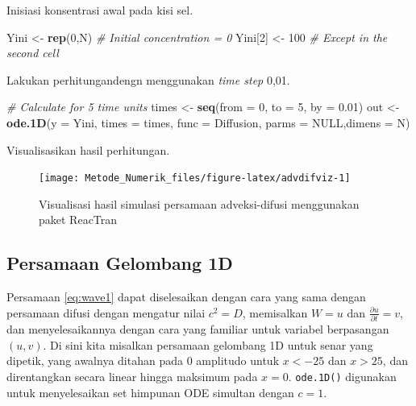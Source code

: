 \documentclass[
]{book}
\newenvironment{Shaded}{\begin{snugshade}}{\end{snugshade}}
\newcommand{\AttributeTok}[1]{\textcolor[rgb]{0.13,0.29,0.53}{#1}}
\newcommand{\CommentTok}[1]{\textcolor[rgb]{0.56,0.35,0.01}{\textit{#1}}}
\newcommand{\ConstantTok}[1]{\textcolor[rgb]{0.56,0.35,0.01}{#1}}
\newcommand{\DecValTok}[1]{\textcolor[rgb]{0.00,0.00,0.81}{#1}}
\newcommand{\FloatTok}[1]{\textcolor[rgb]{0.00,0.00,0.81}{#1}}
\newcommand{\FunctionTok}[1]{\textcolor[rgb]{0.13,0.29,0.53}{\textbf{#1}}}
\newcommand{\NormalTok}[1]{#1}
\newcommand{\OtherTok}[1]{\textcolor[rgb]{0.56,0.35,0.01}{#1}}
\theoremstyle{definition}
\theoremstyle{definition}
\theoremstyle{definition}
\theoremstyle{definition}
\theoremstyle{remark}
\begin{document}
Inisiasi konsentrasi awal pada kisi sel.

\begin{Shaded}
\begin{Highlighting}[]
\NormalTok{Yini }\OtherTok{\textless{}{-}} \FunctionTok{rep}\NormalTok{(}\DecValTok{0}\NormalTok{,N) }\CommentTok{\# Initial concentration = 0}
\NormalTok{Yini[}\DecValTok{2}\NormalTok{] }\OtherTok{\textless{}{-}} \DecValTok{100}   \CommentTok{\# Except in the second cell}
\end{Highlighting}
\end{Shaded}

Lakukan perhitungandengn menggunakan \emph{time step} 0,01.

\begin{Shaded}
\begin{Highlighting}[]
\CommentTok{\# Calculate for 5 time units}
\NormalTok{times }\OtherTok{\textless{}{-}} \FunctionTok{seq}\NormalTok{(}\AttributeTok{from =} \DecValTok{0}\NormalTok{, }\AttributeTok{to =} \DecValTok{5}\NormalTok{, }\AttributeTok{by =} \FloatTok{0.01}\NormalTok{)}
\NormalTok{out }\OtherTok{\textless{}{-}} \FunctionTok{ode.1D}\NormalTok{(}\AttributeTok{y =}\NormalTok{ Yini, }\AttributeTok{times =}\NormalTok{ times, }\AttributeTok{func =}\NormalTok{ Diffusion,}
             \AttributeTok{parms =} \ConstantTok{NULL}\NormalTok{,}\AttributeTok{dimens =}\NormalTok{ N)}
\end{Highlighting}
\end{Shaded}

Visualisasikan hasil perhitungan.

\begin{figure}

{\centering \texttt{[image: Metode\_Numerik\_files/figure-latex/advdifviz-1]} 

}

\caption{Visualisasi hasil simulasi persamaan adveksi-difusi menggunakan paket ReacTran}\label{fig:advdifviz}
\end{figure}

\hypertarget{persamaan-gelombang-1d}{%
\subsection{Persamaan Gelombang 1D}\label{persamaan-gelombang-1d}}

Persamaan \eqref{eq:wave1} dapat diselesaikan dengan cara yang sama dengan persamaan difusi dengan mengatur nilai \(c^2=D\), memisalkan \(W=u\) dan \(\frac{\partial u}{\partial t}=v\), dan menyelesaikannya dengan cara yang familiar untuk variabel berpasangan \(\left(u,v\right)\). Di sini kita misalkan persamaan gelombang 1D untuk senar yang dipetik, yang awalnya ditahan pada \(0\) amplitudo untuk \(x <−25\) dan \(x> 25\), dan direntangkan secara linear hingga maksimum pada \(x = 0\). \texttt{ode.1D()} digunakan untuk menyelesaikan set himpunan ODE simultan dengan \(c = 1\).
\end{document}
